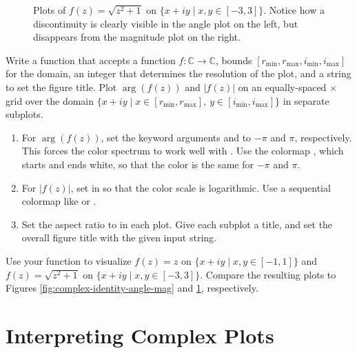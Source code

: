 \begin{figure}[H]
\begin{subfigure}{.49\textwidth}
\end{subfigure}
\caption{Plots of $f(z) = \sqrt{z^2+1}$ on $\{x+iy \mid x,y \in [-3,3]\}$.
Notice how a discontinuity is clearly visible in the angle plot on the left, but disappears from the magnitude plot on the right.}
\label{fig:complex-discontinuity}
\end{figure}

\begin{problem}
Write a function that accepts a function $f:\mathbb{C}\rightarrow\mathbb{C}$,  bounds $[r_{\text{min}},r_{\text{max}},i_{\text{min}},i_{\text{max}}]$ for the domain, an integer  that determines the resolution of the plot, and a string to set the figure title.
Plot $\arg(f(z))$ and $|f(z)|$ on an equally-spaced $\times$ grid over the domain $\{x + iy \mid x \in [r_{\text{min}},r_{\text{max}}],\: y \in [i_{\text{min}},i_{\text{max}}]\}$ in separate subplots.
\begin{enumerate}
\item For $\arg(f(z))$, set the  keyword arguments  and  to $-\pi$ and $\pi$, respectively.
This forces the color spectrum to work well with .
Use the colormap , which starts and ends white, so that the color is the same for $-\pi$ and $\pi$.

\item For $|f(z)|$, set  in  so that the color scale is logarithmic.
Use a sequential colormap like  or .

\item Set the aspect ratio to  in each plot.
Give each subplot a title, and set the overall figure title with the given input string.
\end{enumerate}

Use your function to visualize $f(z) = z$ on $\{x+iy \mid x,y \in [-1,1]\}$ and $f(z) = \sqrt{z^2+1}$ on $\{x+iy \mid x,y \in [-3,3]\}$.
Compare the resulting plots to Figures \ref{fig:complex-identity-angle-mag} and \ref{fig:complex-discontinuity}, respectively.
\label{prob:complex-plotting-function}
\end{problem}

\section*{Interpreting Complex Plots} %

